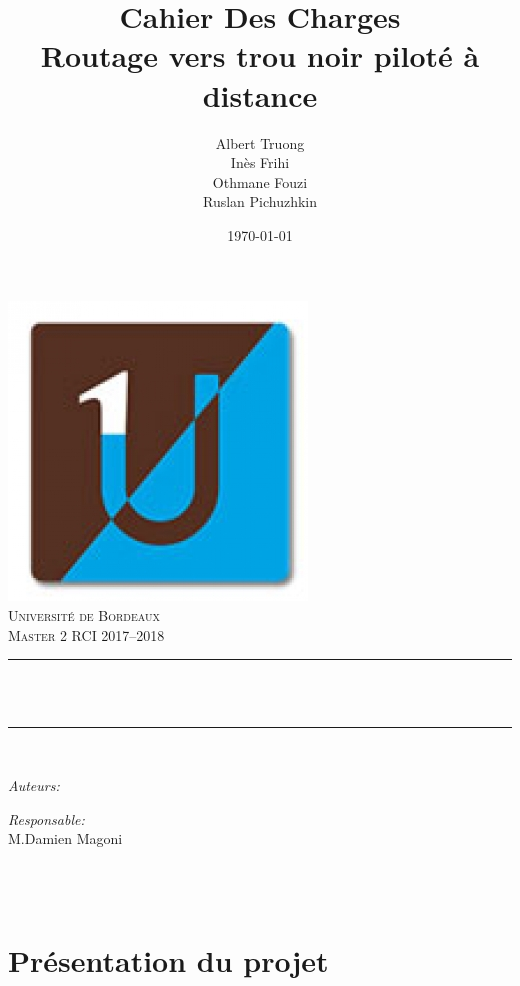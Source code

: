 \documentclass[12pt]{article}
\title{Cahier Des Charges \\[0.4 cm] Routage vers trou noir piloté à distance }
\author{{Albert Truong} \\{Inès Frihi}\\{Othmane Fouzi} \\ {Ruslan Pichuzhkin} }
\date{\today}
\makeatletter
\let\thetitle\@title
\let\theauthor\@author
\let\thedate\@date
\makeatother
\begin{document}

\begin{titlepage}
	\centering
    \vspace*{0.5 cm}
    \includegraphics[width=0.2 \textwidth]{images/bdx.jpg}\\[1.0 cm]	%
    \textsc{\LARGE Université de Bordeaux}\\[2.0 cm]	%
	\textsc{\large Master 2 RCI 2017–2018}\\[0.5 cm]				%
	\rule{\linewidth}{0.2 mm} \\[0.4 cm]
	{\huge \bfseries \thetitle }\\
	\rule{\linewidth}{0.2 mm} \\[1.5 cm]
	
	\begin{minipage}{0.4\textwidth}
		\begin{flushleft} \large
			\emph{Auteurs:}\\
            \vspace{0.2cm}
		    \theauthor
			\end{flushleft}
			\end{minipage}
			\begin{minipage}{0.4\textwidth}
			\begin{flushright} \large
            \vspace{-1.5cm}
			\emph{Responsable:} \\
            \vspace{0.2cm}
			M.Damien Magoni 	
								
		\end{flushright}
	\end{minipage}\\[2 cm]
	
	{\large \thedate}\\[2 cm]
 
	\vfill
	
\end{titlepage}
\tableofcontents
\clearpage


\section{Présentation du projet}

\end{document}
